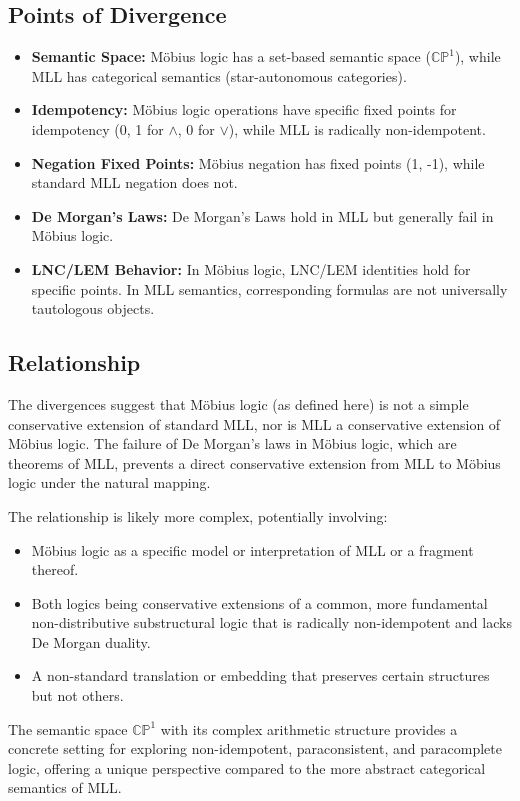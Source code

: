 \documentclass{article}
\begin{document}
	\subsection{Points of Divergence}
	\begin{itemize}
		\item \textbf{Semantic Space:} M\"{o}bius logic has a set-based semantic space ($\mathbb{CP}^1$), while MLL has categorical semantics (star-autonomous categories).
		\item \textbf{Idempotency:} M\"{o}bius logic operations have specific fixed points for idempotency ({0, 1} for $\wedge$, {0} for $\vee$), while MLL is radically non-idempotent.
		\item \textbf{Negation Fixed Points:} M\"{o}bius negation has fixed points ({1, -1}), while standard MLL negation does not.
		\item \textbf{De Morgan's Laws:} De Morgan's Laws hold in MLL but generally fail in M\"{o}bius logic.
		\item \textbf{LNC/LEM Behavior:} In M\"{o}bius logic, LNC/LEM identities hold for specific points. In MLL semantics, corresponding formulas are not universally tautologous objects.
	\end{itemize}
	
	\subsection{Relationship}
	The divergences suggest that M\"{o}bius logic (as defined here) is not a simple conservative extension of standard MLL, nor is MLL a conservative extension of M\"{o}bius logic. The failure of De Morgan's laws in M\"{o}bius logic, which are theorems of MLL, prevents a direct conservative extension from MLL to M\"{o}bius logic under the natural mapping.
	
	The relationship is likely more complex, potentially involving:
	\begin{itemize}
		\item M\"{o}bius logic as a specific model or interpretation of MLL or a fragment thereof.
		\item Both logics being conservative extensions of a common, more fundamental non-distributive substructural logic that is radically non-idempotent and lacks De Morgan duality.
		\item A non-standard translation or embedding that preserves certain structures but not others.
	\end{itemize}
	The semantic space $\mathbb{CP}^1$ with its complex arithmetic structure provides a concrete setting for exploring non-idempotent, paraconsistent, and paracomplete logic, offering a unique perspective compared to the more abstract categorical semantics of MLL.
	
\end{document}
